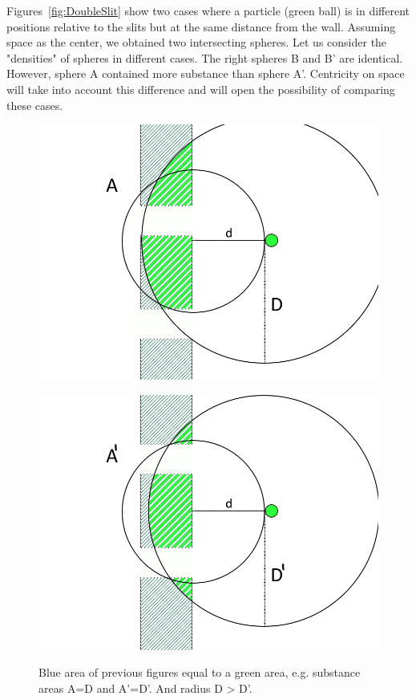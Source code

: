 \documentclass[12pt, a4paper, twocolumn]{article}
\newcommand{\githubPics}{https://raw.githubusercontent.com/artamono1/druhg/master/papers/druhg/}
\begin{document}
Figures~\ref{fig:DoubleSlit} show two cases where a particle (green ball) is in different positions relative to the slits but at the same distance from the wall. Assuming space as the center, we obtained two intersecting spheres. Let us consider the "densities" of spheres in different cases. The right spheres B and B' are identical. However, sphere A contained more substance than sphere A'. Centricity on space will take into account this difference and will open the possibility of comparing these cases.

\begin{figure}[!htb]
  \begin{minipage}[c]{0.40\linewidth}
    \href{\githubPics pdn_double_slit2a.png}{\includegraphics[width=\linewidth]{pdn_double_slit2a.png}}
  \end{minipage}\hfill
  \begin{minipage}[c]{0.40\linewidth}
    \href{\githubPics pdn_double_slit2b.png}{\includegraphics[width=\linewidth]{pdn_double_slit2b.png}}
  \end{minipage}
  \caption{Blue area of previous figures equal to a green area, e.g. substance areas A=D and A'=D'. And radius D > D'.} \label{fig:DoubleSlit2}
\end{figure}
\end{document}
